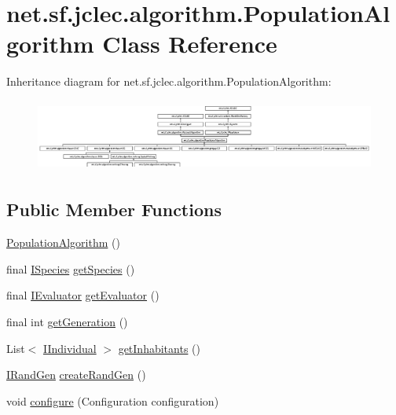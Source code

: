 \hypertarget{classnet_1_1sf_1_1jclec_1_1algorithm_1_1_population_algorithm}{\section{net.\-sf.\-jclec.\-algorithm.\-Population\-Algorithm Class Reference}
\label{classnet_1_1sf_1_1jclec_1_1algorithm_1_1_population_algorithm}
}
Inheritance diagram for net.\-sf.\-jclec.\-algorithm.\-Population\-Algorithm\-:\begin{figure}[H]
\begin{center}
\leavevmode
\includegraphics[height=2.397004cm]{classnet_1_1sf_1_1jclec_1_1algorithm_1_1_population_algorithm}
\end{center}
\end{figure}
\subsection*{Public Member Functions}
\begin{DoxyCompactItemize}
\item 
\hyperlink{classnet_1_1sf_1_1jclec_1_1algorithm_1_1_population_algorithm_a6b1bcf0b3ea134e671d388368bdbdc58}{Population\-Algorithm} ()
\item 
final \hyperlink{interfacenet_1_1sf_1_1jclec_1_1_i_species}{I\-Species} \hyperlink{classnet_1_1sf_1_1jclec_1_1algorithm_1_1_population_algorithm_ad32f7610ceba513ea5bca22eac5ddb47}{get\-Species} ()
\item 
final \hyperlink{interfacenet_1_1sf_1_1jclec_1_1_i_evaluator}{I\-Evaluator} \hyperlink{classnet_1_1sf_1_1jclec_1_1algorithm_1_1_population_algorithm_a79ca50400a7b5ae602b4d161a302c730}{get\-Evaluator} ()
\item 
final int \hyperlink{classnet_1_1sf_1_1jclec_1_1algorithm_1_1_population_algorithm_a1d2f359150bf4e3fe01463003ba2085c}{get\-Generation} ()
\item 
List$<$ \hyperlink{interfacenet_1_1sf_1_1jclec_1_1_i_individual}{I\-Individual} $>$ \hyperlink{classnet_1_1sf_1_1jclec_1_1algorithm_1_1_population_algorithm_af04d16bafb9154a606ad93994bbe647e}{get\-Inhabitants} ()
\item 
\hyperlink{interfacenet_1_1sf_1_1jclec_1_1util_1_1random_1_1_i_rand_gen}{I\-Rand\-Gen} \hyperlink{classnet_1_1sf_1_1jclec_1_1algorithm_1_1_population_algorithm_a2e6d329e569962f969df045cd5c01d2b}{create\-Rand\-Gen} ()
\item 
void \hyperlink{classnet_1_1sf_1_1jclec_1_1algorithm_1_1_population_algorithm_a627616f62b739b52d869b8978ec23e95}{configure} (Configuration configuration)
\end{DoxyCompactItemize}
